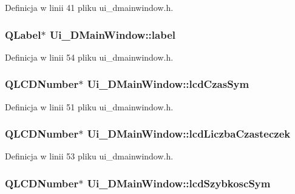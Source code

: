 Definicja w linii 41 pliku ui\-\_\-dmainwindow.\-h.

\hypertarget{class_ui___d_main_window_aa528e417bc72cda19dfcea49f1617b2a}{
\subsubsection[{label}]{\setlength{\rightskip}{0pt plus 5cm}Q\-Label$\ast$ Ui\-\_\-\-D\-Main\-Window\-::label}}\label{class_ui___d_main_window_aa528e417bc72cda19dfcea49f1617b2a}


Definicja w linii 54 pliku ui\-\_\-dmainwindow.\-h.

\hypertarget{class_ui___d_main_window_af49335a21dc17e53674f8b62a640ca2d}{
\subsubsection[{lcd\-Czas\-Sym}]{\setlength{\rightskip}{0pt plus 5cm}Q\-L\-C\-D\-Number$\ast$ Ui\-\_\-\-D\-Main\-Window\-::lcd\-Czas\-Sym}}\label{class_ui___d_main_window_af49335a21dc17e53674f8b62a640ca2d}


Definicja w linii 51 pliku ui\-\_\-dmainwindow.\-h.

\hypertarget{class_ui___d_main_window_a3d6afe29d882b3a9119b68d79c9b5e0f}{
\subsubsection[{lcd\-Liczba\-Czasteczek}]{\setlength{\rightskip}{0pt plus 5cm}Q\-L\-C\-D\-Number$\ast$ Ui\-\_\-\-D\-Main\-Window\-::lcd\-Liczba\-Czasteczek}}\label{class_ui___d_main_window_a3d6afe29d882b3a9119b68d79c9b5e0f}


Definicja w linii 53 pliku ui\-\_\-dmainwindow.\-h.

\hypertarget{class_ui___d_main_window_a4eb8e2a87080f4f314eb96c52a82e39d}{
\subsubsection[{lcd\-Szybkosc\-Sym}]{\setlength{\rightskip}{0pt plus 5cm}Q\-L\-C\-D\-Number$\ast$ Ui\-\_\-\-D\-Main\-Window\-::lcd\-Szybkosc\-Sym}}\label{class_ui___d_main_window_a4eb8e2a87080f4f314eb96c52a82e39d}


